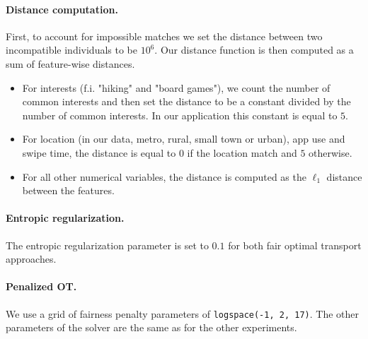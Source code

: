 \documentclass{article}
\theoremstyle{definition}
\begin{document}
\paragraph{Distance computation.} First, to account for impossible matches we set the distance between two incompatible individuals to be $10^6$. Our distance function is then computed as a sum of feature-wise distances. 
\begin{itemize}
    \item For interests (f.i. "hiking" and "board games"), we count the number of common interests and then set the distance to be a constant divided by the number of common interests. In our application this constant is equal to $5$. 
    \item For location (in our data, metro, rural, small town or urban), app use and swipe time, the distance is equal to $0$ if the location match and $5$ otherwise.
    \item For all other numerical variables, the distance is computed as the $\ell_1$ distance between the features. 
\end{itemize}
\paragraph{Entropic regularization.} The entropic regularization parameter is set to $0.1$ for both fair optimal transport approaches.
\paragraph{Penalized OT.} We use a grid of fairness penalty parameters of \texttt{logspace(-1, 2, 17)}. The other parameters of the solver are the same as for the other experiments.
\end{document}
